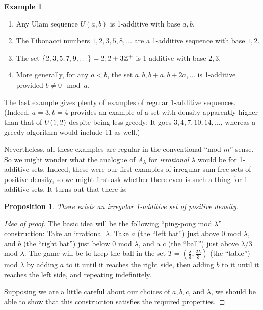 \documentclass{article}
\newtheorem{proposition}[theorem]{Proposition}
\theoremstyle{definition}
\newtheorem{example}{Example}
\theoremstyle{remark}
\numberwithin{equation}{section}
\begin{document}
\begin{example}
  \begin{enumerate}
  \item Any Ulam sequence $U(a,b)$ is 1-additive with base $a, b$.  
  \item The Fibonacci numbers $1, 2, 3, 5, 8, \ldots$ are a 1-additive
    sequence with base $1, 2$.  
  \item The set $\{2, 3, 5, 7, 9, \ldots\} = 2, 2+3\mathbb{Z}^+$ is 1-additive
    with base $2, 3$.  
  \item More generally, for any $a < b$, the set $a, b, b+a, b+2a,
    \ldots$ is 1-additive provided $b \neq 0 \mod{a}$.  
  \end{enumerate}
\end{example}

The last example gives plenty of examples of regular 1-additive
sequences.  (Indeed, $a = 3, b = 4$ provides an example of a set with
density apparently higher than that of $U(1,2)$ despite being
less greedy: It goes $3, 4, 7, 10, 14, \ldots$, whereas a greedy
algorithm would include 11 as well.)  

Nevertheless, all these examples are regular in the conventional
``mod-$m$'' sense.  So we might wonder what the analogue of
$A_\lambda$ for {\em irrational} $\lambda$ would be for 1-additive sets.
Indeed, these were our first examples of irregular sum-free sets of
positive density, so we might first ask whether there even is such a
thing for 1-additive sets.  It turns out that there is:

\begin{proposition}
  There exists an irregular 1-additive set of positive density.
\end{proposition}

\begin{proof}[Idea of proof]
  The basic idea will be the following ``ping-pong mod $\lambda$''
  construction: Take an irrational $\lambda$.  Take $a$ (the ``left
  bat'') just above $0$ mod $\lambda$, and $b$ (the ``right bat'')
  just below 0 mod $\lambda$, and a $c$ (the ``ball'') just above
  $\lambda/3$ mod $\lambda$.  The game will be to keep the ball in the
  set $T = (\frac{\lambda}{3}, \frac{2\lambda}{3})$ (the ``table'')
  mod $\lambda$ by adding $a$ to it until it reaches the right side,
  then adding $b$ to it until it reaches the left side, and repeating
  indefinitely.

  Supposing we are a little careful about our choices of $a, b, c$,
  and $\lambda$, we should be able to show that this construction
  satisfies the required properties.
\end{proof}
\end{document}
